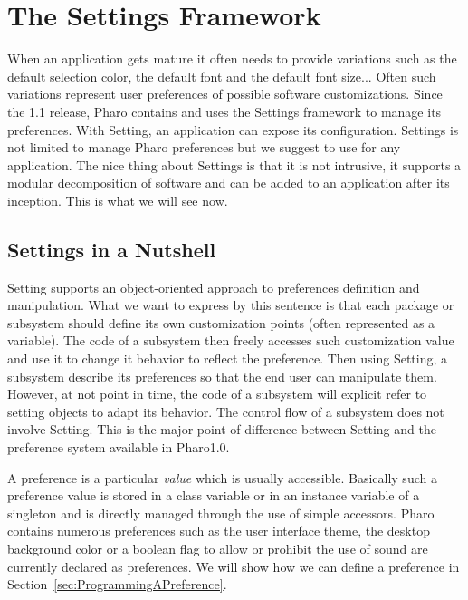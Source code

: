 \documentclass[a4paper,10pt,twoside]{book}
\begin{document}
\fi
\sloppy
\chapter{The Settings Framework}

When an application gets mature it often needs to provide variations such as the default selection color, the default font and the default font size... Often such variations represent user preferences of possible software customizations. 
Since the 1.1 release, Pharo contains and uses the Settings framework to manage its preferences. With Setting, an application can expose its configuration. Settings is not limited to manage Pharo preferences but we suggest to use for any application. The nice thing about Settings is that it is not intrusive, it supports a modular decomposition of software and can be added to an application after its inception. This is what we will see now.

\section{Settings in a Nutshell}

Setting supports an object-oriented approach to preferences definition and manipulation. What we want to express by this sentence is that each package or subsystem should define its own customization points (often represented as a variable). The code of a subsystem then freely accesses such customization value and use it to change it behavior to reflect the preference. Then using Setting, a subsystem describe its preferences so that the end user can manipulate them. However, at not point in time, the code of a subsystem will explicit refer to setting objects to adapt its behavior. The control flow of a subsystem does not involve Setting. This is the major point of difference between Setting and the preference system available in Pharo1.0.

A preference is a particular \emph{value} which is usually accessible. Basically such a preference value is stored in a class variable or in an instance variable of a singleton and is directly managed through the use of simple accessors. Pharo contains numerous preferences such as the user interface theme, the desktop background color or a boolean flag to allow or prohibit the use of sound are currently declared as preferences. We will show how we can define a preference in Section~\ref{sec:ProgrammingAPreference}. 
\end{document}

